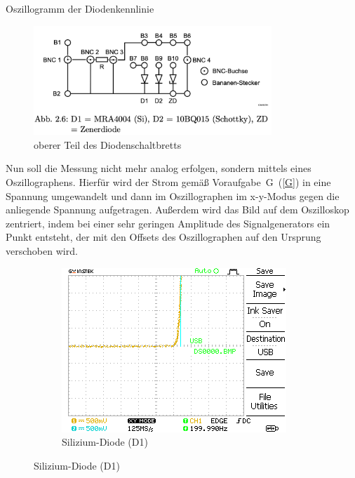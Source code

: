 \documentclass{article}
\theoremstyle{definition}
\begin{document}
\begin{aufgabe}{Oszillogramm der Diodenkennlinie}
    \aufbau
    \begin{figure}[H]
        \centering
        \includegraphics[width=0.8\textwidth]{figs/Aufbau2.png}
        \caption{oberer Teil des Diodenschaltbretts\cite{anleitung}}
        \label{aufbau_2_2}
    \end{figure}
Nun soll die Messung nicht mehr analog erfolgen, sondern mittels eines Oszillographens. Hierfür wird der Strom gemäß Voraufgabe~G~(\ref{G}) in eine Spannung umgewandelt und dann im Oszillographen im x-y-Modus gegen die anliegende Spannung aufgetragen. Außerdem wird das Bild auf dem Oszilloskop zentriert, indem bei einer sehr geringen Amplitude des Signalgenerators ein Punkt entsteht, der mit den Offsets des Oszillographen auf den Ursprung verschoben wird.
    \messwerte 
    \begin{figure}[H]
        \centering
        \begin{subfigure}[b]{0.45 \textwidth}
            \includegraphics[width=\textwidth]{MesswerteVersuch2/m2_0.png}
            \caption{Silizium-Diode (D1)}
            \label{a2_0}
        \end{subfigure}

\end{figure}
\end{aufgabe}
\end{document}
